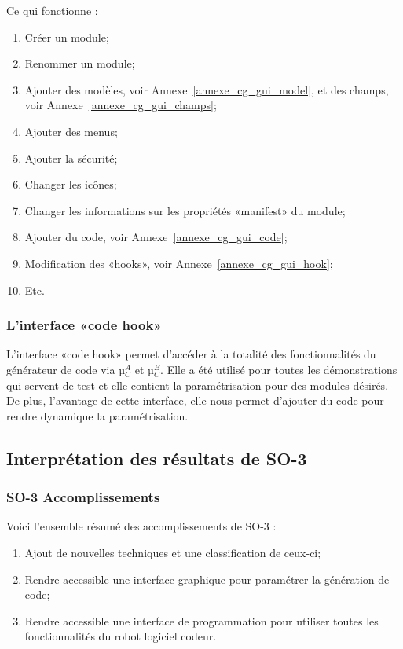 Ce qui fonctionne : 
\begin{enumerate}
    \item Créer un module;
    \item Renommer un module;
    \item Ajouter des modèles, voir Annexe~\ref{annexe_cg_gui_model}, et des champs, voir Annexe~\ref{annexe_cg_gui_champs};
    \item Ajouter des menus;
    \item Ajouter la sécurité;
    \item Changer les icônes;
    \item Changer les informations sur les propriétés «manifest» du module;
    \item Ajouter du code, voir Annexe~\ref{annexe_cg_gui_code};
    \item Modification des «hooks», voir Annexe~\ref{annexe_cg_gui_hook};
    \item Etc.
\end{enumerate}

\subsubsection{L'interface «code hook»}


L'interface «code hook» permet d’accéder à la totalité des fonctionnalités du générateur de code via µ$_C^A$ et µ$_C^B$. Elle a été utilisé pour toutes les démonstrations qui servent de test et elle contient la paramétrisation pour des modules désirés. De plus, l'avantage de cette interface, elle nous permet d'ajouter du code pour rendre dynamique la paramétrisation.

\subsection{Interprétation des résultats de SO-3}

\subsubsection{SO-3 Accomplissements}
Voici l'ensemble résumé des accomplissements de SO-3 :
\begin{enumerate}
    \item Ajout de nouvelles techniques et une classification de ceux-ci;
    \item Rendre accessible une interface graphique pour paramétrer la génération de code;
    \item Rendre accessible une interface de programmation pour utiliser toutes les fonctionnalités du robot logiciel codeur.
\end{enumerate}

